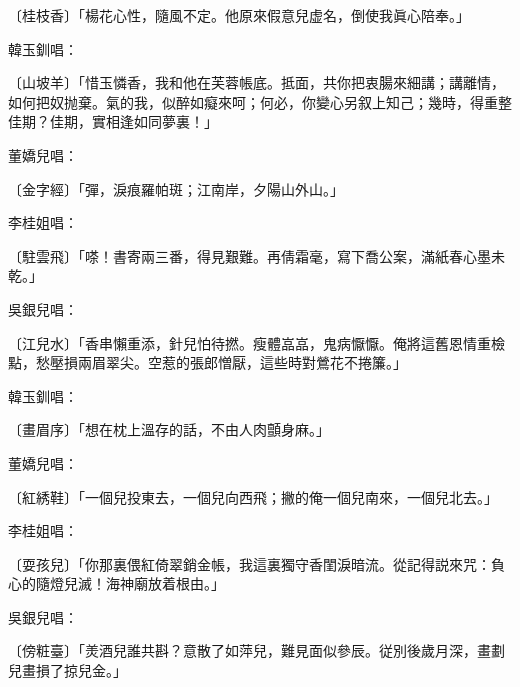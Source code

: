 \begin{myquote}
{\markfont〔桂枝香〕}「楊花心性，隨風不定。他原來假意兒虚名，倒使我眞心陪奉。」
\end{myquote}

韓玉釧唱：

\begin{myquote}
{\markfont〔山坡羊〕}「惜玉憐香，我和他在芙蓉帳底。抵面，共你把衷腸來細講；講離情，如何把奴抛棄。氣的我，似醉如癡來呵；何必，你變心另叙上知己；幾時，得重整佳期？佳期，實相逢如同夢裏！」
\end{myquote}

董嬌兒唱：

\begin{myquote}
{\markfont〔金字經〕}「彈，淚痕羅帕斑；江南岸，夕陽山外山。」
\end{myquote}

李桂姐唱：

\begin{myquote}
{\markfont〔駐雲飛〕}「嗏！書寄兩三番，得見艱難。再倩霜毫，寫下喬公案，滿紙春心墨未乾。」
\end{myquote}

吳銀兒唱：

\begin{myquote}
{\markfont〔江兒水〕}「香串懶重添，針兒怕待撚。瘦體嵓嵓，鬼病懨懨。俺將這舊恩情重檢點，愁壓損兩眉翠尖。空惹的張郎憎厭，這些時對鶯花不捲簾。」
\end{myquote}

韓玉釧唱：

\begin{myquote}
{\markfont〔畫眉序〕}「想在枕上溫存的話，不由人肉顫身麻。」
\end{myquote}

董嬌兒唱：

\begin{myquote}
{\markfont〔紅綉鞋〕}「一個兒投東去，一個兒向西飛；撇的俺一個兒南來，一個兒北去。」
\end{myquote}

李桂姐唱：

\begin{myquote}
{\markfont〔耍孩兒〕}「你那裏偎紅倚翠銷金帳，我這裏獨守香閨淚暗流。從記得説來咒：負心的隨燈兒滅！海神廟放着根由。」
\end{myquote}

吳銀兒唱：

\begin{myquote}
{\markfont〔傍粧臺〕}「羙酒兒誰共斟？意散了如萍兒，難見面似參辰。従別後歲月深，畫劃兒畫損了掠兒金。」
\end{myquote}

